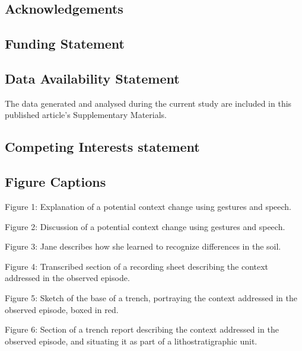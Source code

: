 \subsection*{Acknowledgements}

\subsection*{Funding Statement}

\subsection*{Data Availability Statement}
The data generated and analysed during the current study are included in this
published article's Supplementary Materials.

\subsection*{Competing Interests statement}


\subsection*{Figure Captions}
\noindent Figure 1: Explanation of a potential context change using gestures and speech.

\noindent Figure 2: Discussion of a potential context change using gestures and speech.

\noindent Figure 3: Jane describes how she learned to recognize differences in the soil.

\noindent Figure 4: Transcribed section of a recording sheet describing the context addressed in the observed episode.

\noindent Figure 5: Sketch of the base of a trench, portraying the context addressed in the observed episode, boxed in red.

\noindent Figure 6: Section of a trench report describing the context addressed in the observed episode, and situating it as part of a lithostratigraphic unit.



